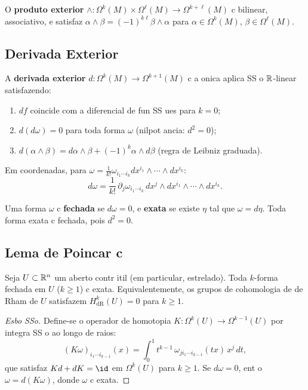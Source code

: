 O \textbf{produto exterior} $\wedge:\Omega^k(M)\times\Omega^\ell(M)\to\Omega^{k+\ell}(M)$ c bilinear, associativo, e satisfaz $\alpha\wedge\beta = (-1)^{k\ell}\beta\wedge\alpha$ para $\alpha\in\Omega^k(M)$, $\beta\in\Omega^\ell(M)$.

\subsection{Derivada Exterior}

\begin{defi}
A \textbf{derivada exterior} $d:\Omega^k(M)\to\Omega^{k+1}(M)$ c a onica aplica SS o $\mathbb{R}$-linear satisfazendo:
\begin{enumerate}
 \item $df$ coincide com a diferencial de fun SS ues para $k=0$;
 \item $d(d\omega)=0$ para toda forma $\omega$ (nilpot ancia: $d^2=0$);
 \item $d(\alpha\wedge\beta) = d\alpha\wedge\beta + (-1)^k\alpha\wedge d\beta$ (regra de Leibniz graduada).
\end{enumerate}
Em coordenadas, para $\omega = \frac{1}{k!}\omega_{i_1\cdots i_k}dx^{i_1}\wedge\cdots\wedge dx^{i_k}$:
\begin{equation}
 d\omega = \frac{1}{k!}\,\partial_j\omega_{i_1\cdots i_k}\,dx^j\wedge dx^{i_1}\wedge\cdots\wedge dx^{i_k}.
\end{equation}
\end{defi}

\begin{defi}
Uma forma $\omega$ c \textbf{fechada} se $d\omega=0$, e \textbf{exata} se existe $\eta$ tal que $\omega = d\eta$. Toda forma exata c fechada, pois $d^2=0$.
\end{defi}

\subsection{Lema de Poincar c}

\begin{teo}
Seja $U\subset\mathbb{R}^n$ um aberto contr itil (em particular, estrelado). Toda $k$-forma fechada em $U$ ($k\geq 1$) c exata. Equivalentemente, os grupos de cohomologia de de Rham de $U$ satisfazem $H^k_{\text{dR}}(U)=0$ para $k\geq 1$.
\end{teo}

\begin{proof}[Esbo SSo]
Define-se o operador de homotopia $K:\Omega^k(U)\to\Omega^{k-1}(U)$ por integra SS o ao longo de raios:
\begin{equation}
 (K\omega)_{i_1\cdots i_{k-1}}(x) = \int_0^1 t^{k-1}\,\omega_{j i_1\cdots i_{k-1}}(tx)\,x^j\,dt,
\end{equation}
que satisfaz $Kd + dK = \id$ em $\Omega^k(U)$ para $k\geq 1$. Se $d\omega=0$, ent o $\omega = d(K\omega)$, donde $\omega$ c exata.
\end{proof}

